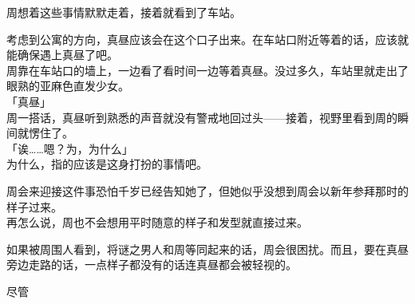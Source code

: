 周想着这些事情默默走着，接着就看到了车站。

考虑到公寓的方向，真昼应该会在这个口子出来。在车站口附近等着的话，应该就能确保遇上真昼了吧。\\

周靠在车站口的墙上，一边看了看时间一边等着真昼。没过多久，车站里就走出了眼熟的亚麻色直发少女。\\

「真昼」\\

周一搭话，真昼听到熟悉的声音就没有警戒地回过头——接着，视野里看到周的瞬间就愣住了。\\

「诶……嗯？为，为什么」\\

为什么，指的应该是这身打扮的事情吧。

周会来迎接这件事恐怕千岁已经告知她了，但她似乎没想到周会以新年参拜那时的样子过来。\\

再怎么说，周也不会想用平时随意的样子和发型就直接过来。

如果被周围人看到，将谜之男人和周等同起来的话，周会很困扰。而且，要在真昼旁边走路的话，一点样子都没有的话连真昼都会被轻视的。

尽管



